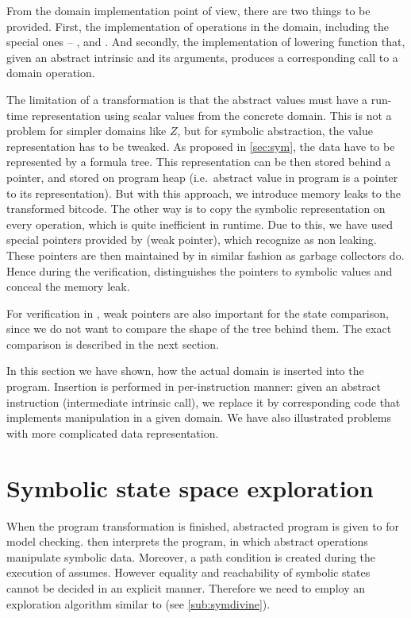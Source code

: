 From the domain implementation point of view, there are two things to be
provided. First, the implementation of operations in the domain, including
the special ones -- ,  and .
And secondly, the implementation of lowering function that, given an abstract
\LART intrinsic and its arguments, produces a corresponding call to a domain
operation.

The limitation of a transformation is that the abstract values must have a
run-time representation using scalar values from the concrete domain. This is
not a problem for simpler domains like $Z$, but for symbolic abstraction, the
value representation has to be tweaked. As proposed in \autoref{sec:sym}, the
data have to be represented by a formula tree. This representation can be
then stored behind a pointer, and stored on program heap (i.e.~abstract value in
program is a pointer to its representation). But with this approach, we
introduce memory leaks to the transformed bitcode. The other way is to copy the symbolic
representation on every operation, which is quite inefficient in runtime. Due to
this, we have used special pointers provided by \DIVINE (weak pointer), which
\DIVINE recognize as non leaking. These pointers are then maintained by \DIVM in
similar fashion as garbage collectors do. Hence during the verification, \DIVINE
distinguishes the pointers to symbolic values and conceal the memory leak.

For verification in \DIVINE, weak pointers are also important for the state
comparison, since we do not want to compare the shape of the tree behind them.
The exact comparison is described in the next section.

\begin{summary}
In this section we have shown, how the actual domain is inserted into the
program. Insertion is performed in per-instruction manner: given an abstract
instruction (intermediate intrinsic call), we replace it by corresponding code
that implements manipulation in a given domain. We have also illustrated
problems with more complicated data representation.
\end{summary}

\section{Symbolic state space exploration} \label{sec:symbolic}

When the program transformation is finished, abstracted program is given to
\DIVINE for model checking. \DIVINE then interprets the program, in which
abstract operations manipulate symbolic data. Moreover, a path condition is
created during the execution of assumes. However equality and reachability of
symbolic states cannot be decided in an explicit manner. Therefore we need to
employ an exploration algorithm similar to
\SymDIVINE (see \autoref{sub:symdivine}).

